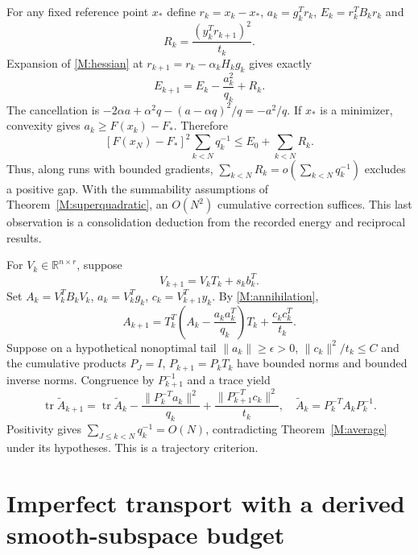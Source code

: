 For any fixed reference point $x_*$ define $r_k=x_k-x_*$, $a_k=g_k^Tr_k$, $E_k=r_k^TB_kr_k$ and
\[
 R_k=\frac{(y_k^Tr_{k+1})^2}{t_k}.
\]
Expansion of \eqref{M:hessian} at $r_{k+1}=r_k-\alpha_kH_kg_k$ gives exactly
\begin{equation}\label{M:fixedenergy}
 E_{k+1}=E_k-\frac{a_k^2}{q_k}+R_k.
\end{equation}
The cancellation is $-2\alpha a+\alpha^2q-(a-\alpha q)^2/q=-a^2/q$. If $x_*$ is a minimizer, convexity gives $a_k\ge F(x_k)-F_*$. Therefore
\begin{equation}\label{M:energybound}
 [F(x_N)-F_*]^2\sum_{k<N}q_k^{-1}\le E_0+\sum_{k<N}R_k.
\end{equation}
Thus, along runs with bounded gradients, $\sum_{k<N}R_k=o(\sum_{k<N}q_k^{-1})$ excludes a positive gap. With the summability assumptions of Theorem~\ref{M:superquadratic}, an $O(N^2)$ cumulative correction suffices. This last observation is a consolidation deduction from the recorded energy and reciprocal results.

For $V_k\in\mathbb R^{n\times r}$, suppose
\[
 V_{k+1}=V_kT_k+s_kb_k^T.
\]
Set $A_k=V_k^TB_kV_k$, $a_k=V_k^Tg_k$, $c_k=V_{k+1}^Ty_k$. By \eqref{M:annihilation},
\begin{equation}\label{M:frameidentity}
 A_{k+1}=T_k^T\left(A_k-\frac{a_ka_k^T}{q_k}\right)T_k+\frac{c_kc_k^T}{t_k}.
\end{equation}
Suppose on a hypothetical nonoptimal tail $\|a_k\|\ge\epsilon>0$, $\|c_k\|^2/t_k\le C$ and the cumulative products $P_J=I$, $P_{k+1}=P_kT_k$ have bounded norms and bounded inverse norms. Congruence by $P_{k+1}^{-1}$ and a trace yield
\[
 \operatorname{tr}\widetilde A_{k+1}=\operatorname{tr}\widetilde A_k
 -\frac{\|P_k^{-T}a_k\|^2}{q_k}
 +\frac{\|P_{k+1}^{-T}c_k\|^2}{t_k},\quad
 \widetilde A_k=P_k^{-T}A_kP_k^{-1}.
\]
Positivity gives $\sum_{J\le k<N}q_k^{-1}=O(N)$, contradicting Theorem~\ref{M:average} under its hypotheses. This is a trajectory criterion.



\section{Imperfect transport with a derived smooth-subspace budget}
\label{M:residual}

